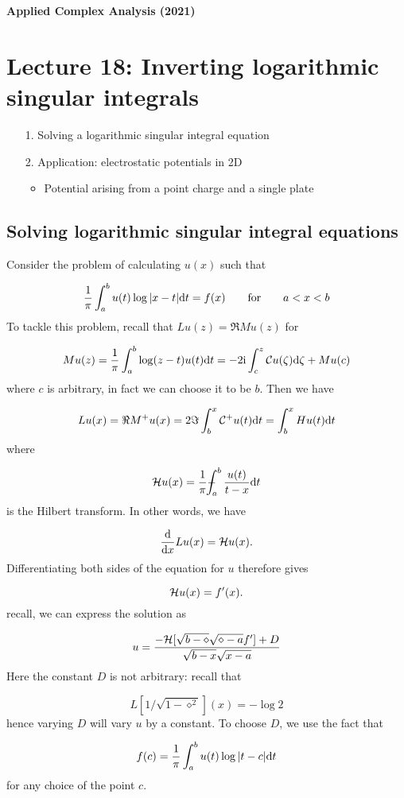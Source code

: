 \documentclass[12pt,landscape]{article}
\def\qqfor{\qquad\hbox{for}\qquad}
\def\D{ {\rm d} }
\def\I{ {\rm i} }
\def\CC{ {\cal C} }
\def\HH{ {\cal H} }
\def\Xint#1{ \mathchoice
   {\XXint\displaystyle\textstyle{#1} }%
   {\XXint\textstyle\scriptstyle{#1} }%
   {\XXint\scriptstyle\scriptscriptstyle{#1} }%
   {\XXint\scriptscriptstyle\scriptscriptstyle{#1} }%
   \!\int}
\def\XXint#1#2#3{ {\setbox0=\hbox{$#1{#2#3}{\int}$}
     \vcenter{\hbox{$#2#3$}}\kern-.5\wd0} }
\def\dashint{\Xint-}
\def\dx{\D x}
\def\dt{\D t}
\begin{document}
{\LARGE
\sf
\textbf{Applied Complex Analysis (2021)}

\section{Lecture 18: Inverting logarithmic singular integrals}
\begin{itemize}
\item[1. ] Solving a logarithmic singular integral equation


\item[2. ] Application: electrostatic potentials in 2D

\begin{itemize}
\item Potential arising from a point charge and a single plate

\end{itemize}
\end{itemize}
\subsection{Solving logarithmic singular integral equations}
Consider the problem of calculating $u(x)$ such that

\[
{1 \over \pi} \int_a^b u(t) \log | x-t| \dt = f(x) \qqfor a < x < b
\]
To tackle this problem, recall that $L u(z) = \Re M u(z)$ for

\[
M u(z) = {1 \over \pi} \int_a^b \log(z-t) u(t) \D t =  -2 \I \int_c^z \CC u(\zeta) \D \zeta + M u(c)
\]
where $c$ is arbitrary, in fact we can choose it to be $b$. Then we have

\[
L u(x) =  \Re M^+ u(x) = 2\Im \int_b^x \CC^+ u(t) \D t =  \int_b^x H u(t) \D t
\]
where

\[
\HH u(x) = {1 \over \pi} \dashint_a^b {u(t) \over t -x } \D t
\]
is the Hilbert transform. In other words, we have

\[
{\D \over \dx} L u(x) = \HH u(x).
\]
Differentiating both sides of the equation for $u$ therefore gives

\[
\HH u(x) = f'(x).
\]
recall, we can express the solution as

\[
    u = {-\HH[\sqrt{b-\diamond}\sqrt{\diamond-a} f'] + D \over \sqrt{b-x}\sqrt{x-a}}
\]
Here the constant $D$ is not arbitrary: recall that

\[
L[1/\sqrt{1-\diamond^2}](x) = - \log 2
\]
hence varying $D$ will vary $u$ by a constant. To choose $D$,  we use the fact that

\[
f(c) = {1 \over \pi} \int_a^b u(t) \log |t-c| \dt
\]
for any choice of the point  $c$.

}
\end{document}
